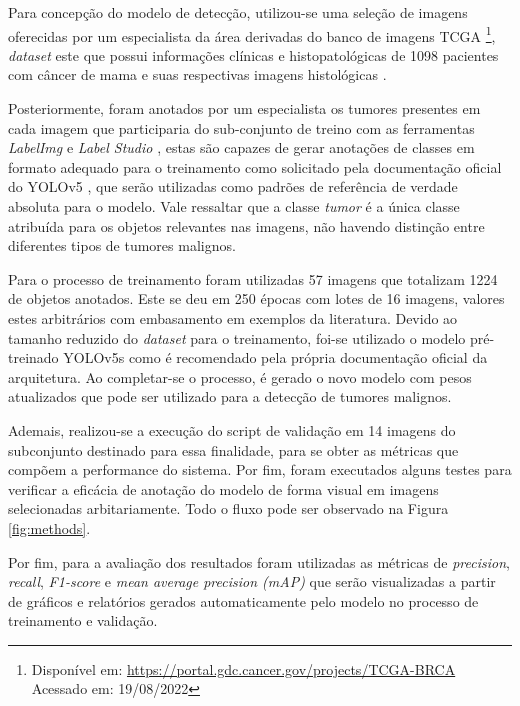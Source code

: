 \documentclass[12pt]{article}
\begin{document}
Para concepção do modelo de detecção, utilizou-se uma seleção de imagens oferecidas por um especialista da área derivadas do banco de imagens TCGA \footnote{Disponível em: \url{https://portal.gdc.cancer.gov/projects/TCGA-BRCA} Acessado em: 19/08/2022 }, {\it dataset} este que possui informações clínicas e histopatológicas de 1098 pacientes com câncer de mama e suas respectivas imagens histológicas \cite{tiezzi2020}.

Posteriormente, foram anotados por um especialista os tumores presentes em cada imagem que participaria do sub-conjunto de treino com as ferramentas {\it LabelImg} \cite{tzutalin2015labelimg} e {\it Label Studio} \cite{labelStudio}, estas são capazes de gerar anotações de classes em formato adequado para o treinamento como solicitado pela documentação oficial do YOLOv5 \cite{glenn_jocher_2022}, que serão utilizadas como padrões de referência de verdade absoluta para o modelo. Vale ressaltar que a classe {\it tumor} é a única classe atribuída para os objetos relevantes nas imagens, não havendo distinção entre diferentes tipos de tumores malignos.

Para o processo de treinamento foram utilizadas 57 imagens que totalizam 1224 de objetos anotados. Este se deu em 250 épocas com lotes de 16 imagens, valores estes arbitrários com embasamento em exemplos da literatura. Devido ao tamanho reduzido do {\it dataset} para o treinamento, foi-se utilizado o modelo pré-treinado YOLOv5s \cite{glenn_jocher_2022} como é recomendado pela própria documentação oficial da arquitetura. Ao completar-se o processo, é gerado o novo modelo com pesos atualizados que pode ser utilizado para a detecção de tumores malignos.

Ademais, realizou-se a execução do script de validação em 14 imagens do subconjunto destinado para essa finalidade, para se obter as métricas que compõem a performance do sistema. Por fim, foram executados alguns testes para verificar a eficácia de anotação do modelo de forma visual em imagens selecionadas arbitariamente. Todo o fluxo pode ser observado na Figura \ref{fig:methods}.

Por fim, para a avaliação dos resultados foram utilizadas as métricas de {\it precision}, {\it recall}, {\it F1-score} e {\it mean average precision (mAP)} que serão visualizadas a partir de gráficos e relatórios gerados automaticamente pelo modelo no processo de treinamento e validação.
\end{document}
